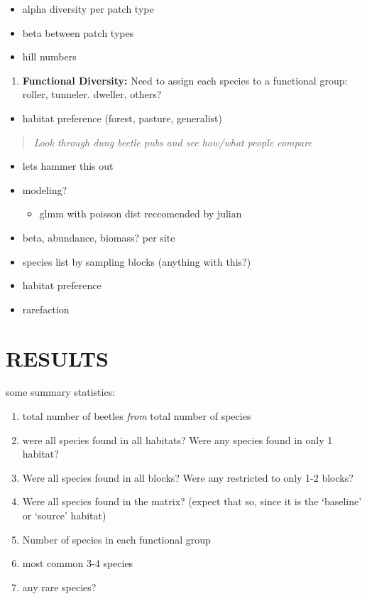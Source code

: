 \documentclass[
]{article}
\providecommand{\tightlist}{%
  \setlength{\itemsep}{0pt}\setlength{\parskip}{0pt}}
\begin{document}
\begin{itemize}
\tightlist
\item
  alpha diversity per patch type
\item
  beta between patch types
\item
  hill numbers
\end{itemize}

\begin{enumerate}
\def\labelenumi{\arabic{enumi}.}
\tightlist
\item
  \textbf{Functional Diversity:} Need to assign each species to a
  functional group: roller, tunneler. dweller, others?
\end{enumerate}

\begin{itemize}
\tightlist
\item
  habitat preference (forest, pasture, generalist)
\end{itemize}

\begin{quote}
\emph{Look through dung beetle pubs and see how/what people compare}
\end{quote}

\begin{itemize}
\tightlist
\item
  lets hammer this out
\item
  modeling?

  \begin{itemize}
  \tightlist
  \item
    glmm with poisson dist reccomended by julian
  \end{itemize}
\item
  beta, abundance, biomass? per site
\item
  species list by sampling blocks (anything with this?)
\item
  habitat preference
\item
  rarefaction
\end{itemize}

\hypertarget{results}{%
\section{RESULTS}\label{results}}

some summary statistics:

\begin{enumerate}
\def\labelenumi{\arabic{enumi}.}
\tightlist
\item
  total number of beetles \emph{from} total number of species
\item
  were all species found in all habitats? Were any species found in only
  1 habitat?
\item
  Were all species found in all blocks? Were any restricted to only 1-2
  blocks?
\item
  Were all species found in the matrix? (expect that so, since it is the
  `baseline' or `source' habitat)
\item
  Number of species in each functional group
\item
  most common 3-4 species
\item
  any rare species?
\end{enumerate}
\end{document}
